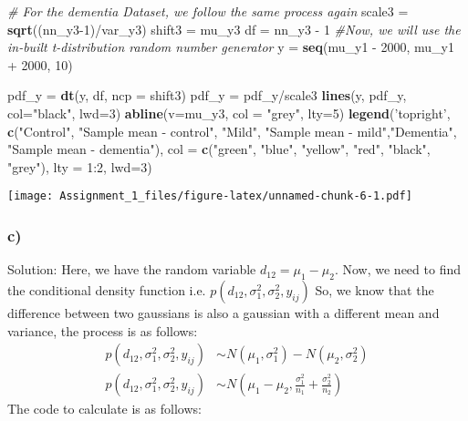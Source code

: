 \documentclass[]{article}
\newenvironment{Shaded}{\begin{snugshade}}{\end{snugshade}}
\newcommand{\KeywordTok}[1]{\textcolor[rgb]{0.13,0.29,0.53}{\textbf{{#1}}}}
\newcommand{\DataTypeTok}[1]{\textcolor[rgb]{0.13,0.29,0.53}{{#1}}}
\newcommand{\DecValTok}[1]{\textcolor[rgb]{0.00,0.00,0.81}{{#1}}}
\newcommand{\StringTok}[1]{\textcolor[rgb]{0.31,0.60,0.02}{{#1}}}
\newcommand{\CommentTok}[1]{\textcolor[rgb]{0.56,0.35,0.01}{\textit{{#1}}}}
\newcommand{\NormalTok}[1]{{#1}}
\begin{document}
\begin{Shaded}
\begin{Highlighting}[]
\CommentTok{# For the dementia Dataset, we follow the same process again}
\NormalTok{scale3 =}\StringTok{ }\KeywordTok{sqrt}\NormalTok{((nn_y3}\DecValTok{-1}\NormalTok{)/var_y3)}
\NormalTok{shift3 =}\StringTok{ }\NormalTok{mu_y3}
\NormalTok{df =}\StringTok{ }\NormalTok{nn_y3 -}\StringTok{ }\DecValTok{1}
\CommentTok{#Now, we will use the in-built t-distribution random number generator}
\NormalTok{y =}\StringTok{ }\KeywordTok{seq}\NormalTok{(mu_y1 -}\StringTok{ }\DecValTok{2000}\NormalTok{, mu_y1 +}\StringTok{ }\DecValTok{2000}\NormalTok{, }\DecValTok{10}\NormalTok{)}

\NormalTok{pdf_y =}\StringTok{ }\KeywordTok{dt}\NormalTok{(y, df, }\DataTypeTok{ncp =} \NormalTok{shift3)}
\NormalTok{pdf_y =}\StringTok{ }\NormalTok{pdf_y/scale3}
\KeywordTok{lines}\NormalTok{(y, pdf_y, }\DataTypeTok{col=}\StringTok{"black"}\NormalTok{, }\DataTypeTok{lwd=}\DecValTok{3}\NormalTok{)}
\KeywordTok{abline}\NormalTok{(}\DataTypeTok{v=}\NormalTok{mu_y3, }\DataTypeTok{col =} \StringTok{"grey"}\NormalTok{, }\DataTypeTok{lty=}\DecValTok{5}\NormalTok{)}
\KeywordTok{legend}\NormalTok{(}\StringTok{'topright'}\NormalTok{, }\KeywordTok{c}\NormalTok{(}\StringTok{"Control"}\NormalTok{, }\StringTok{"Sample mean - control"}\NormalTok{, }\StringTok{"Mild"}\NormalTok{, }\StringTok{"Sample mean - mild"}\NormalTok{,}\StringTok{"Dementia"}\NormalTok{, }\StringTok{"Sample mean - dementia"}\NormalTok{), }\DataTypeTok{col =} \KeywordTok{c}\NormalTok{(}\StringTok{"green"}\NormalTok{, }\StringTok{"blue"}\NormalTok{, }\StringTok{"yellow"}\NormalTok{, }\StringTok{"red"}\NormalTok{, }\StringTok{"black"}\NormalTok{, }\StringTok{"grey"}\NormalTok{), }\DataTypeTok{lty =} \DecValTok{1}\NormalTok{:}\DecValTok{2}\NormalTok{, }\DataTypeTok{lwd=}\DecValTok{3}\NormalTok{)}
\end{Highlighting}
\end{Shaded}

\texttt{[image: Assignment\_1\_files/figure-latex/unnamed-chunk-6-1.pdf]}

\subsubsection{c)}\label{c-1}

Solution: Here, we have the random variable \(d_{12} = \mu_1 - \mu_2\).
Now, we need to find the conditional density function i.e.
\(p(d_{12}, \sigma_1^2, \sigma_2^2, y_{ij})\) So, we know that the
difference between two gaussians is also a gaussian with a different
mean and variance, the process is as follows: \[
\begin{align*}
p(d_{12}, \sigma_1^2, \sigma_2^2, y_{ij}) &\sim N(\mu_1,\sigma_1^2) - N(\mu_2,\sigma_2^2) \\
p(d_{12}, \sigma_1^2, \sigma_2^2, y_{ij}) &\sim N(\mu_1 - \mu_2, \frac{\sigma_1^2}{n_1} + \frac{\sigma_2^2}{n_2})
\end{align*}
\] The code to calculate is as follows:
\end{document}
